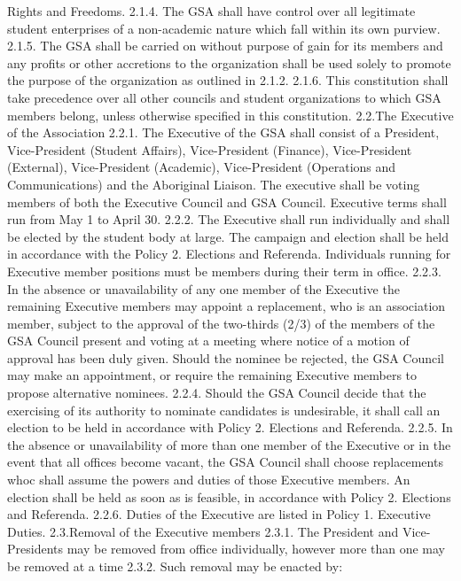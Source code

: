 \documentclass{article}
\begin{document}
Rights and Freedoms. 
2.1.4. The GSA shall have control over all legitimate student enterprises of a 
non-academic nature which fall within its own purview. 
2.1.5. The GSA shall be carried on without purpose of gain for its members 
and any profits or other accretions to the organization shall be used 
solely to promote the purpose of the organization as outlined in 2.1.2. 
2.1.6. This constitution shall take precedence over all other councils and 
student organizations to which GSA members belong, unless otherwise 
specified in this constitution. 
2.2.The Executive of the Association 
2.2.1. The Executive of the GSA shall consist of a President, Vice-President 
(Student Affairs), Vice-President (Finance), Vice-President (External), 
Vice-President (Academic), Vice-President (Operations and 
Communications) and the Aboriginal Liaison. The executive shall be 
voting members of both the Executive Council and GSA Council. 
Executive terms shall run from May 1 to April 30. 
2.2.2. The Executive shall run individually and shall be elected by the 
student body at large. The campaign and election shall be held in 
accordance with the Policy 2. Elections and Referenda. Individuals 
running for Executive member positions must be members during their 
term in office. 
2.2.3. In the absence or unavailability of any one member of the Executive 
the remaining Executive members may appoint a replacement, who is 
an association member, subject to the approval of the two-thirds (2/3) 
of the members of the GSA Council present and voting at a meeting 
where notice of a motion of approval has been duly given. Should the 
nominee be rejected, the GSA Council may make an appointment, or 
require the remaining Executive members to propose alternative 
nominees. 
2.2.4. Should the GSA Council decide that the exercising of its authority to 
nominate candidates is undesirable, it shall call an election to be held 
in accordance with Policy 2. Elections and Referenda. 
2.2.5. In the absence or unavailability of more than one member of the 
Executive or in the event that all offices become vacant, the GSA 
Council shall choose replacements whoc shall assume the powers and 
duties of those Executive members. An election shall be held as soon 
as is feasible, in accordance with Policy 2. Elections and Referenda. 
2.2.6. Duties of the Executive are listed in Policy 1. Executive Duties. 
2.3.Removal of the Executive members 
2.3.1. The President and Vice-Presidents may be removed from office 
individually, however more than one may be removed at a time 
2.3.2. Such removal may be enacted by: 
\end{document}
